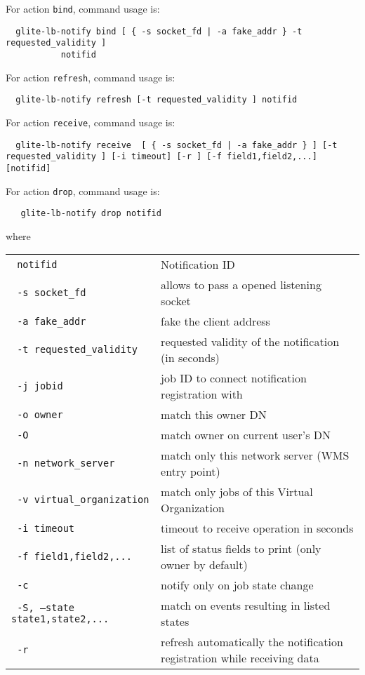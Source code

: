 For action \verb'bind', command usage is:
\begin{verbatim}
  glite-lb-notify bind [ { -s socket_fd | -a fake_addr } -t requested_validity ] 
           notifid
\end{verbatim}

For action \verb'refresh', command usage is:
\begin{verbatim}
  glite-lb-notify refresh [-t requested_validity ] notifid
\end{verbatim}

For action \verb'receive', command usage is:
\begin{verbatim}
  glite-lb-notify receive  [ { -s socket_fd | -a fake_addr } ] [-t requested_validity ] [-i timeout] [-r ] [-f field1,field2,...] [notifid]
\end{verbatim}

For action \verb'drop', command usage is:
\begin{verbatim}
   glite-lb-notify drop notifid
\end{verbatim}

where

\begin{tabularx}{\textwidth}{lX}
\texttt{  notifid} & Notification ID \\
\texttt{  -s socket\_fd} &  allows  to  pass  a opened listening socket  \\
\texttt{  -a fake\_addr} &  fake the client address \\
\texttt{  -t requested\_validity} & requested validity of the notification (in seconds)   \\
\texttt{  -j jobid} & job ID to connect notification registration with   \\
\texttt{  -o owner} & match this owner DN   \\
\texttt{  -O} & match owner on current user's DN \\
\texttt{  -n network\_server} &  match only this network server (WMS entry point)  \\
\texttt{  -v virtual\_organization} & match only jobs of this Virtual Organization  \\
\texttt{  -i timeout} & timeout to receive operation in seconds   \\
\texttt{  -f field1,field2,...} & list of status fields to print (only owner by default)   \\
\texttt{  -c} & notify only on job state change \\
\texttt{  -S, --state state1,state2,...} & match on events resulting in listed states   \\
\texttt{  -r} & refresh automatically the notification registration while receiving data\\
\end{tabularx}

